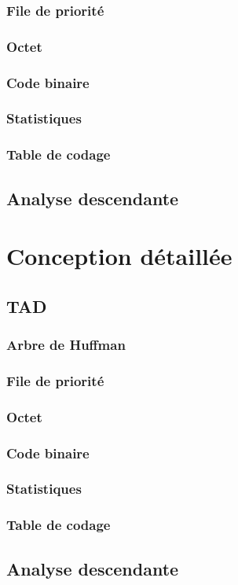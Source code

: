 \documentclass[12pt,a4paper]{article}
\begin{document}
\subsubsection{File de priorité}

\subsubsection{Octet}

\subsubsection{Code binaire}

\subsubsection{Statistiques}

\subsubsection{Table de codage}

\subsection{Analyse descendante}

\section{Conception détaillée}
\subsection{TAD}
\subsubsection{Arbre de Huffman}

\subsubsection{File de priorité}

\subsubsection{Octet}

\subsubsection{Code binaire}

\subsubsection{Statistiques}

\subsubsection{Table de codage}

\subsection{Analyse descendante}

\end{document}
